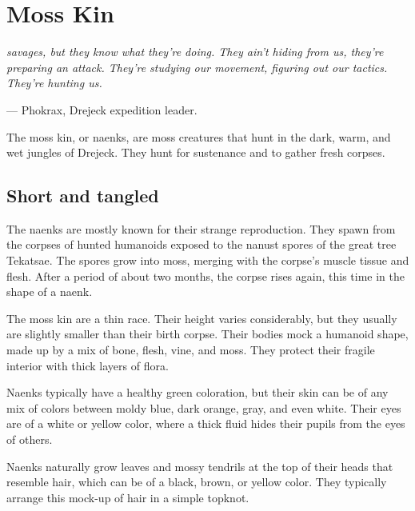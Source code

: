 \section{Moss Kin} \label{kin::naenk}
\textit{savages, but they know what they're doing.
They ain't hiding from us, they're preparing an attack.
They're studying our movement, figuring out our tactics.
They're hunting us.}

\hspace*{\fill} --- Phokrax, Drejeck expedition leader.

The moss kin, or naenks, are moss creatures that hunt in the dark, warm, and wet jungles of Drejeck.
They hunt for sustenance and to gather fresh corpses.

\subsection*{Short and tangled}
    The naenks are mostly known for their strange reproduction.
    They spawn from the corpses of hunted humanoids exposed to the nanust spores of the great tree Tekatsae.
    The spores grow into moss, merging with the corpse's muscle tissue and flesh.
    After a period of about two months, the corpse rises again, this time in the shape of a naenk.

    The moss kin are a thin race.
    Their height varies considerably, but they usually are slightly smaller than their birth corpse.
    Their bodies mock a humanoid shape, made up by a mix of bone, flesh, vine, and moss.
    They protect their fragile interior with thick layers of flora.

    Naenks typically have a healthy green coloration, but their skin can be of any mix of colors between moldy blue, dark orange, gray, and even white.
    Their eyes are of a white or yellow color, where a thick fluid hides their pupils from the eyes of others.

    Naenks naturally grow leaves and mossy tendrils at the top of their heads that resemble hair, which can be of a black, brown, or yellow color.
    They typically arrange this mock-up of hair in a simple topknot.


